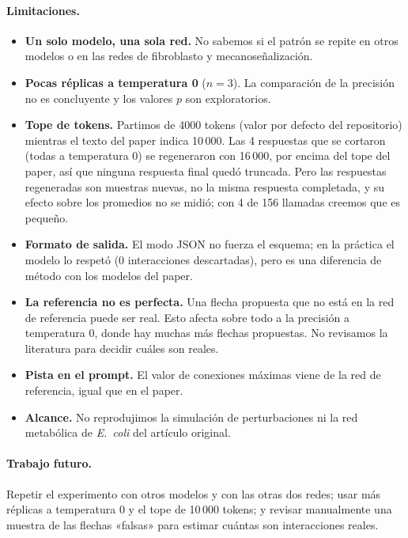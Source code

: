 \documentclass[unnumsec,webpdf,contemporary,large]{oup-authoring-template}
\begin{document}
\paragraph{Limitaciones.}
\begin{itemize}
\item \textbf{Un solo modelo, una sola red.} No sabemos si el patrón se repite en otros modelos o en las redes de fibroblasto y mecanoseñalización.
\item \textbf{Pocas réplicas a temperatura 0} ($n=3$). La comparación de la precisión no es concluyente y los valores $p$ son exploratorios.
\item \textbf{Tope de tokens.} Partimos de 4000 tokens (valor por defecto del repositorio) mientras el texto del paper indica 10\,000. Las 4 respuestas que se cortaron (todas a temperatura 0) se regeneraron con 16\,000, por encima del tope del paper, así que ninguna respuesta final quedó truncada. Pero las respuestas regeneradas son muestras nuevas, no la misma respuesta completada, y su efecto sobre los promedios no se midió; con 4 de 156 llamadas creemos que es pequeño.
\item \textbf{Formato de salida.} El modo JSON no fuerza el esquema; en la práctica el modelo lo respetó (0 interacciones descartadas), pero es una diferencia de método con los modelos del paper.
\item \textbf{La referencia no es perfecta.} Una flecha propuesta que no está en la red de referencia puede ser real. Esto afecta sobre todo a la precisión a temperatura 0, donde hay muchas más flechas propuestas. No revisamos la literatura para decidir cuáles son reales.
\item \textbf{Pista en el prompt.} El valor de conexiones máximas viene de la red de referencia, igual que en el paper.
\item \textbf{Alcance.} No reprodujimos la simulación de perturbaciones ni la red metabólica de \emph{E.~coli} del artículo original.
\end{itemize}

\paragraph{Trabajo futuro.} Repetir el experimento con otros modelos y con las otras dos redes; usar más réplicas a temperatura 0 y el tope de 10\,000 tokens; y revisar manualmente una muestra de las flechas «falsas» para estimar cuántas son interacciones reales.

\end{document}
